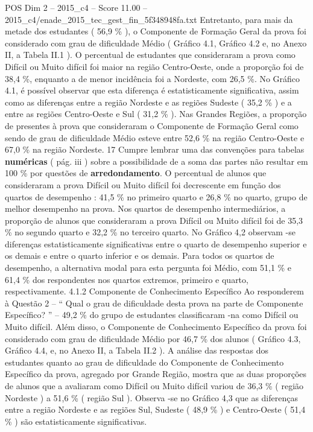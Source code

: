 \begin{textsample}{POS Dim 2 – 2015\_c4 – Score 11.00 – 2015\_c4/enade\_2015\_tec\_gest\_fin\_5f348948fa.txt}
Entretanto, para mais da metade dos estudantes ( 56,9 \% ), o Componente de Formação Geral da prova foi considerado com grau de dificuldade Médio ( Gráfico 4.1, Gráfico 4.2 e, no Anexo II, a Tabela II.1 ).
O percentual de estudantes que consideraram a prova como Difícil ou Muito difícil foi maior na região Centro-Oeste, onde a proporção foi de 38,4 \%, enquanto a de menor incidência foi a Nordeste, com 26,5 \%.
No Gráfico 4.1, é possível observar que esta diferença é estatisticamente significativa, assim como as diferenças entre a região Nordeste e as regiões Sudeste ( 35,2 \% ) e a entre as regiões Centro-Oeste e Sul ( 31,2 \% ).
Nas Grandes Regiões, a proporção de presentes à prova que consideraram o Componente de Formação Geral como sendo de grau de dificuldade Médio esteve entre 52,6 \% na região Centro-Oeste e 67,0 \% na região Nordeste. 17 Cumpre lembrar uma das convenções para tabelas \textbf{numéricas} ( pág. iii ) sobre a possibilidade de a soma das partes não resultar em 100 \% por questões de \textbf{arredondamento}.
O percentual de alunos que consideraram a prova Difícil ou Muito difícil foi decrescente em função dos quartos de desempenho : 41,5 \% no primeiro quarto e 26,8 \% no quarto, grupo de melhor desempenho na prova.
Nos quartos de desempenho intermediários, a proporção de alunos que consideraram a prova Difícil ou Muito difícil foi de 35,3 \% no segundo quarto e 32,2 \% no terceiro quarto.
No Gráfico 4,2 observam -se diferenças estatisticamente significativas entre o quarto de desempenho superior e os demais e entre o quarto inferior e os demais.
Para todos os quartos de desempenho, a alternativa modal para esta pergunta foi Médio, com 51,1 \% e 61,4 \% dos respondentes nos quartos extremos, primeiro e quarto, respectivamente. 4.1.2 Componente de Conhecimento Específico Ao responderem à Questão 2 – “ Qual o grau de dificuldade desta prova na parte de Componente Específico? ” – 49,2 \% do grupo de estudantes classificaram -na como Difícil ou Muito difícil.
Além disso, o Componente de Conhecimento Específico da prova foi considerado com grau de dificuldade Médio por 46,7 \% dos alunos ( Gráfico 4.3, Gráfico 4.4, e, no Anexo II, a Tabela II.2 ).
A análise das respostas dos estudantes quanto ao grau de dificuldade do Componente de Conhecimento Específico da prova, agregado por Grande Região, mostra que as duas proporções de alunos que a avaliaram como Difícil ou Muito difícil variou de 36,3 \% ( região Nordeste ) a 51,6 \% ( região Sul ).
Observa -se no Gráfico 4,3 que as diferenças entre a região Nordeste e as regiões Sul, Sudeste ( 48,9 \% ) e Centro-Oeste ( 51,4 \% ) são estatisticamente significativas.

\end{textsample}
